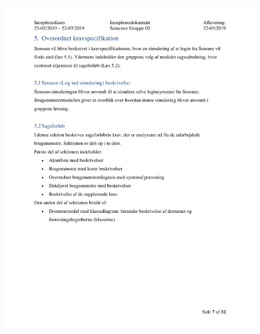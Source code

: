 \begin{figure}[hb]
  \includegraphics[scale = 0.33]{./PNG/Inceptions/Gruppe02+InceptionsDokument-08.jpg} 
\end{figure}

